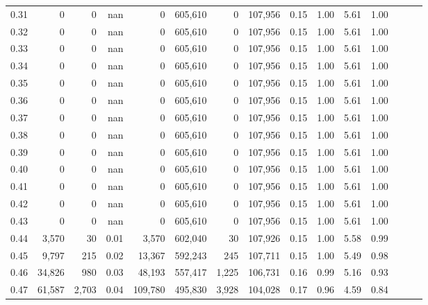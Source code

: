 \begin{tabular}{rrrrrrrrrrrrrrr}
0.31 &        0 &       0 &   nan &        0 &  605,610 &        0 &  107,956 &  0.15 &  1.00 &  5.61 &      1.00 \\
0.32 &        0 &       0 &   nan &        0 &  605,610 &        0 &  107,956 &  0.15 &  1.00 &  5.61 &      1.00 \\
0.33 &        0 &       0 &   nan &        0 &  605,610 &        0 &  107,956 &  0.15 &  1.00 &  5.61 &      1.00 \\
0.34 &        0 &       0 &   nan &        0 &  605,610 &        0 &  107,956 &  0.15 &  1.00 &  5.61 &      1.00 \\
0.35 &        0 &       0 &   nan &        0 &  605,610 &        0 &  107,956 &  0.15 &  1.00 &  5.61 &      1.00 \\
0.36 &        0 &       0 &   nan &        0 &  605,610 &        0 &  107,956 &  0.15 &  1.00 &  5.61 &      1.00 \\
0.37 &        0 &       0 &   nan &        0 &  605,610 &        0 &  107,956 &  0.15 &  1.00 &  5.61 &      1.00 \\
0.38 &        0 &       0 &   nan &        0 &  605,610 &        0 &  107,956 &  0.15 &  1.00 &  5.61 &      1.00 \\
0.39 &        0 &       0 &   nan &        0 &  605,610 &        0 &  107,956 &  0.15 &  1.00 &  5.61 &      1.00 \\
0.40 &        0 &       0 &   nan &        0 &  605,610 &        0 &  107,956 &  0.15 &  1.00 &  5.61 &      1.00 \\
0.41 &        0 &       0 &   nan &        0 &  605,610 &        0 &  107,956 &  0.15 &  1.00 &  5.61 &      1.00 \\
0.42 &        0 &       0 &   nan &        0 &  605,610 &        0 &  107,956 &  0.15 &  1.00 &  5.61 &      1.00 \\
0.43 &        0 &       0 &   nan &        0 &  605,610 &        0 &  107,956 &  0.15 &  1.00 &  5.61 &      1.00 \\
0.44 &    3,570 &      30 &  0.01 &    3,570 &  602,040 &       30 &  107,926 &  0.15 &  1.00 &  5.58 &      0.99 \\
0.45 &    9,797 &     215 &  0.02 &   13,367 &  592,243 &      245 &  107,711 &  0.15 &  1.00 &  5.49 &      0.98 \\
0.46 &   34,826 &     980 &  0.03 &   48,193 &  557,417 &    1,225 &  106,731 &  0.16 &  0.99 &  5.16 &      0.93 \\
0.47 &   61,587 &   2,703 &  0.04 &  109,780 &  495,830 &    3,928 &  104,028 &  0.17 &  0.96 &  4.59 &      0.84 \\

\end{tabular}
